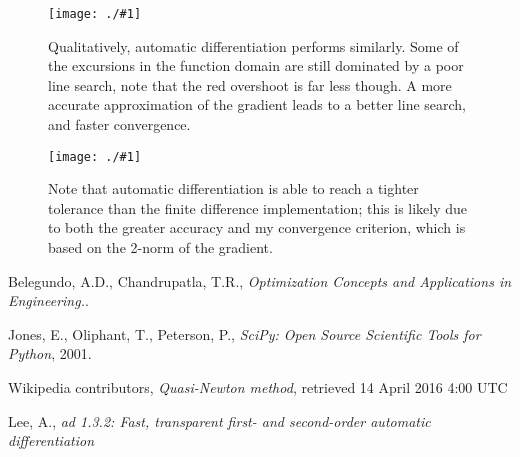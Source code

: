 \documentclass{article}
\newcommand{\img}[2]{
	\begin{figure}[H]
	\centering%
	\texttt{[image: ./\#1]}
	\caption{#2}     %
	\label{fig:#1}   %
	\end{figure} }
\begin{document}
\img{trajectories_ad}{Qualitatively, automatic differentiation performs similarly. Some of the excursions in the function domain are still dominated by a poor line search, note that the red overshoot is far less though. A more accurate approximation of the gradient leads to a better line search, and faster convergence.}

\img{convergence_ad}{Note that automatic differentiation is able to reach a tighter tolerance than the finite difference implementation; this is likely due to both the greater accuracy and my convergence criterion, which is based on the 2-norm of the gradient.}


\begin{thebibliography}{99}

Belegundo, A.D., Chandrupatla, T.R.,
\newblock \emph{Optimization Concepts and Applications in Engineering.}.

Jones, E., Oliphant, T., Peterson, P.,
\newblock \emph{SciPy: Open Source Scientific Tools for Python}, 2001.

Wikipedia contributors,
\newblock \emph{Quasi-Newton method}, retrieved 14 April 2016 4:00 UTC

Lee, A.,
\newblock \emph{ad 1.3.2: Fast, transparent first- and second-order automatic differentiation}

\end{thebibliography}
\end{document}
